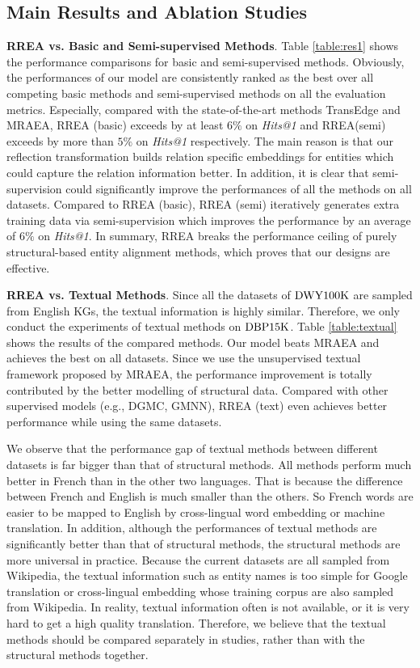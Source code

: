 \documentclass[sigconf,camera-ready]{acmart}
\begin{document}
\subsection{Main Results and Ablation Studies}
\textbf{RREA vs. Basic and Semi-supervised Methods}.
Table \ref{table:res1} shows the performance comparisons for basic and semi-supervised methods.
Obviously, the performances of our model are consistently ranked as the best over all competing basic methods and semi-supervised methods on all the evaluation metrics.
Especially, compared with the state-of-the-art methods TransEdge and MRAEA, RREA (basic) exceeds by at least $6\%$ on \emph{Hits@1} and RREA(semi) exceeds by more than $5\%$ on \emph{Hits@1} respectively.
The main reason is that our reflection transformation builds relation specific embeddings for entities which could capture the relation information better.
In addition, it is clear that semi-supervision could significantly improve the performances of all the methods on all datasets.
Compared to RREA (basic), RREA (semi) iteratively generates extra training data via semi-supervision which improves the performance by an average of $6\%$ on \emph{Hits@1}.
In summary, RREA breaks the performance ceiling of purely structural-based entity alignment methods, which proves that our designs are effective.


\noindent
\textbf{RREA vs. Textual Methods}.
Since all the datasets of $\rm DWY100K$ are sampled from English KGs, the textual information is highly similar.
Therefore, we only conduct the experiments of textual methods on $\rm DBP15K$.
Table \ref{table:textual} shows the results of the compared methods.
Our model beats MRAEA and achieves the best on all datasets.
Since we use the unsupervised textual framework proposed by MRAEA, the performance improvement is totally contributed by the better modelling of structural data.
Compared with other supervised models (e.g., DGMC, GMNN), RREA (text) even achieves better performance while using the same datasets.

We observe that the performance gap of textual methods between different datasets is far bigger than that of structural methods.
All methods perform much better in French than in the other two languages.
That is because the difference between French and English is much smaller than the others.
So French words are easier to be mapped to English by cross-lingual word embedding or machine translation.
In addition, although the performances of textual methods are significantly better than that of structural methods, the structural methods are more universal in practice.
Because the current datasets are all sampled from Wikipedia, the textual information such as entity names is too simple for Google translation or cross-lingual embedding whose training corpus are also sampled from Wikipedia.
In reality, textual information often is not available, or it is very hard to get a high quality translation.
Therefore, we believe that the textual methods should be compared separately in studies, rather than with the structural methods together.
\end{document}
